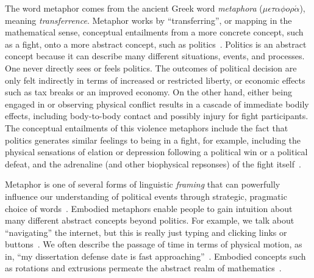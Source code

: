 The word metaphor
comes from the ancient Greek word \emph{metaphora} 
($\mu \epsilon \tau \alpha \phi o \rho \acute{\alpha}$), meaning
\emph{transferrence}.  Metaphor works by ``transferring'', or mapping in
the mathematical sense, conceptual entailments
from a more concrete concept, such as a fight, onto a more abstract concept,
such as politics~\cite{Regier1996,Kovecses2010a,Lakoff2014}. 
Politics is an abstract concept because it can describe many
different situations, events, and processes. One never directly sees or feels
politics. The outcomes of political decision are only felt indirectly in terms
of increased or restricted liberty, or economic effects such as tax breaks or
an improved economy.  On the other hand, either being engaged in or observing physical conflict
results in a cascade of immediate bodily effects, including body-to-body contact and
possibly injury for fight participants. The conceptual entailments of this
violence metaphors include the
fact that politics generates similar feelings to being in a fight, for example, 
including the physical sensations of elation or depression following a political win
or a political defeat, and the adrenaline (and other biophysical repsonses)
of the fight itself~\cite{Gallese2005,David2016}.

Metaphor is one of several forms of linguistic \emph{framing} that can 
powerfully influence our understanding of political
events through strategic, pragmatic choice of 
words~\cite{Fillmore1982,Chong2007,Lakoff2008,Charteris-Black2009,Fausey2011,Matlock2012,Sagi2013a,Cacciatore2016}.
Embodied metaphors enable people to gain intuition about many different
abstract concepts beyond politics. 
For example, we talk about ``navigating'' the internet, but this is 
really just typing and clicking links or buttons~\cite{Matlock2014}.
We often describe the passage of time in terms of physical motion, as in,
``my dissertation defense date is fast 
approaching''~\cite{Matlock2005,Nunez2012,Flusberg2017a}.
Embodied concepts such as rotations and extrusions permeate the abstract realm
of mathematics~\cite{Lakoff1997,Marghetis2013}. 

